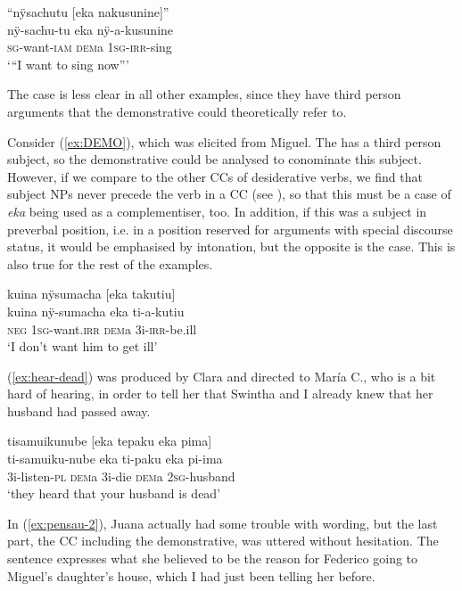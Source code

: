 \ea\label{ex:want-sing}
\begingl
\glpreamble “nÿsachutu \textup{[}eka nakusunine\textup{]}”\\
\gla nÿ-sachu-tu eka nÿ-a-kusunine\\
\textsc{sg}-want-\textsc{iam} \textsc{dem}a 1\textsc{sg}-\textsc{irr}-sing\\
\glft ‘“I want to sing now”’
\endgl
\trailingcitation{[jmx-n120429ls-x5.380]}
\xe

The case is less clear in all other examples, since they have third person arguments that the demonstrative could theoretically refer to.

Consider (\ref{ex:DEMO}), which was elicited from Miguel. The  has a third person subject, so the demonstrative could be analysed to conominate this subject. However, if we compare to the other CCs of desiderative verbs, we find that subject NPs never precede the verb in a CC (see ), so that this must be a case of \textit{eka} being used as a complementiser, too. In addition, if this was a subject in preverbal position, i.e. in a position reserved for arguments with special discourse status, it would be emphasised by intonation, but the opposite is the case. This is also true for the rest of the examples.

\ea\label{ex:DEMO}
\begingl
\glpreamble kuina nÿsumacha \textup{[}eka takutiu\textup{]}\\
\gla kuina nÿ-sumacha eka ti-a-kutiu\\
\glb \textsc{neg} 1\textsc{sg}-want.\textsc{irr} \textsc{dem}a 3i-\textsc{irr}-be.ill\\
\glft ‘I don’t want him to get ill’
\endgl
\trailingcitation{[mxx-e090728s-3.013]}
\xe

(\ref{ex:hear-dead}) was produced by Clara and directed to María C., who is a bit hard of hearing, in order to tell her that Swintha and I already knew that her husband had passed away.

\ea\label{ex:hear-dead}
\begingl
\glpreamble tisamuikunube \textup{[}eka tepaku eka pima\textup{]}\\
\gla ti-samuiku-nube eka ti-paku eka pi-ima\\
\glb 3i-listen-\textsc{pl} \textsc{dem}a 3i-die \textsc{dem}a 2\textsc{sg}-husband\\
\glft ‘they heard that your husband is dead’
\endgl
\trailingcitation{[cux-120410ls.096]}
\xe

In (\ref{ex:pensau-2}), Juana actually had some trouble with wording, but the last part, the CC including the demonstrative, was uttered without hesitation. The sentence expresses what she believed to be the reason for Federico going to Miguel’s daughter’s house, which I had just been telling her before.


